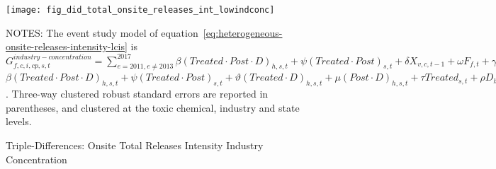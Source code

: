 \begin{figure}[H]
    \centering
    \texttt{[image: fig\_did\_total\_onsite\_releases\_int\_lowindconc]}
    \caption{Triple-Differences: Onsite Total Releases Intensity Industry Concentration}
    \label{fig:heterogeneous-onsite-releases-intensity-lcis}
    \begin{minipage}{12cm}
        \vspace{0.05in}
        NOTES: The event study model of equation~\ref{eq:heterogeneous-onsite-releases-intensity-lcis} is $G_{f,c,i,cp,s,t}^{industry-concentration} = \sum_{{e = 2011},{e \neq 2013}}^{2017} \beta (Treated \cdot Post \cdot D)_{h,s,t} + \psi (Treated \cdot Post)_{s,t} + \delta X_{v,c,t-1} + \omega F_{f,t} + \gamma_{f} + \phi_{cp} + \eta_{c,t} + \left[\lambda_{t} + \theta_{f,h} + \sigma_{s} + \zeta_{c} \right] + \varepsilon_{f,c,i,cp,s,t}$$\beta (Treated \cdot Post \cdot D)_{h,s,t} + \psi (Treated \cdot Post)_{s,t} + \vartheta (Treated \cdot D)_{h,s,t} + \mu (Post \cdot D)_{h,s,t} + \tau Treated_{s,t} + \rho D_{h,s,t} + \alpha Post_{t} + \delta X_{v,c,t-1} + \omega F_{f,t} + \gamma_{f} + \phi_{cp} + \eta_{c,t} + \left[\lambda_{t} + \theta_{h} + \sigma_{s} + \zeta_{c} \right] + \varepsilon_{f,c,i,cp,s,t}$. Three-way clustered robust standard errors are reported in parentheses, and clustered at the toxic chemical, industry and state levels.
    \end{minipage}
\end{figure}